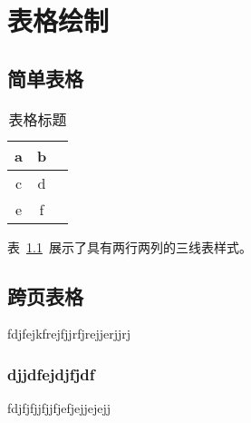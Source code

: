 \chapter{表格绘制}

\section{简单表格}

\begin{table}[htbp]
  \centering
  \caption{表格标题}\label{tab:simpletable}
  \begin{tabular}{ccc}
    \hline
    a & b \\ %
    \hline
    c & d \\
    e & f \\
    \hline
  \end{tabular}
\end{table}

表~\ref{tab:simpletable}~展示了具有两行两列的三线表样式。

\section{跨页表格}
fdjfejkfrejfjjrfjrejjerjjrj
\subsection{djjdfejdjfjdf}
fdjfjfjjfjjfjefjejjejejj


